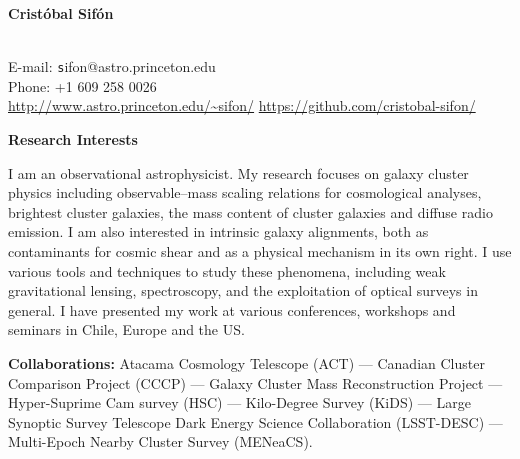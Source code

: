 \documentclass[11pt]{article}
\newcommand\technical[2]{
  \noindent
    {\large\bf #1:} #2\\
  }
\newcommand\sectitle[1]{
  \vspace{0.5cm}
  \noindent
  \textbf{\large #1}\\
  \vspace{-0.2cm}
}
\begin{document}
\begin{minipage}[b]{0.46\linewidth}
\flushleft
\hspace{-0.7cm}
{\bf\huge Crist\'obal Sif\'on}\\\vspace{0.2cm}
\\
\end{minipage}
\begin{minipage}[b]{0.49\linewidth}
\flushright
{\large E-mail: {\texttt sifon@astro.princeton.edu}\\
        Phone: +1 609 258 0026\\
        \url{http://www.astro.princeton.edu/~sifon/}
        \url{https://github.com/cristobal-sifon/}}
\end{minipage}
\vspace{0.4cm}
\hline


\sectitle{Research Interests}

I am an observational astrophysicist. My research focuses on galaxy 
cluster physics including observable--mass scaling relations for cosmological 
analyses, brightest cluster galaxies, the mass content of cluster galaxies and 
diffuse radio emission. I am also interested in intrinsic galaxy alignments, both 
as contaminants for cosmic shear and as a physical mechanism in its own right. I 
use various tools and techniques to study these phenomena, including weak 
gravitational lensing, spectroscopy, and the exploitation of optical surveys in 
general. I have presented my work at various conferences, workshops and seminars 
in Chile, Europe and the US.

\vspace{0.5cm}
\technical{Collaborations}
{
 Atacama Cosmology Telescope (ACT) ---
 Canadian Cluster Comparison Project (CCCP) ---
 Galaxy Cluster Mass Reconstruction Project ---
 Hyper-Suprime Cam survey (HSC) ---
 Kilo-Degree Survey (KiDS) ---
 Large Synoptic Survey Telescope Dark Energy Science Collaboration (LSST-DESC) ---
 Multi-Epoch Nearby Cluster Survey (MENeaCS).
}
\end{document}
